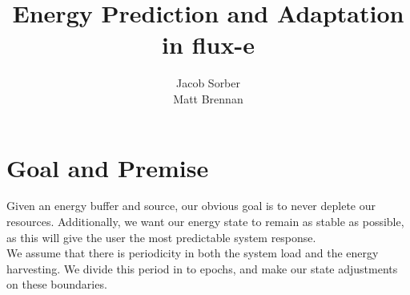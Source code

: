 \documentclass{article}
\begin{document}
\title{Energy Prediction and Adaptation in flux-e}
\author{Jacob Sorber\\Matt Brennan}
\maketitle


\section{Goal and Premise}
Given an energy buffer and source, our obvious goal is to never deplete our resources. Additionally, we want our energy state to remain as stable as possible, as this will give the user the most predictable system response. \\
We assume that there is periodicity in both the system load and the energy harvesting.  We divide this period in to epochs, and make our state adjustments on these boundaries.  
\end{document}
